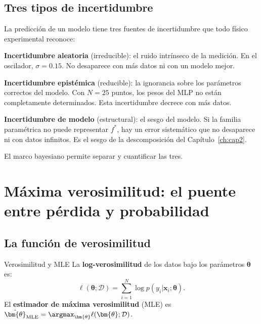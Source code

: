 \subsection{Tres tipos de incertidumbre}
\label{subsec:tres_incertidumbres}

La predicción de un modelo tiene tres fuentes de incertidumbre que todo
físico experimental reconoce:

\textbf{Incertidumbre aleatoria} (irreducible): el ruido intrínseco de
la medición. En el oscilador, $\sigma = 0.15$. No desaparece con más
datos ni con un modelo mejor.

\textbf{Incertidumbre epistémica} (reducible): la ignorancia sobre los
parámetros correctos del modelo. Con $N = 25$ puntos, los pesos del MLP
no están completamente determinados. Esta incertidumbre decrece con más
datos.

\textbf{Incertidumbre de modelo} (estructural): el sesgo del modelo.
Si la familia paramétrica no puede representar $f^*$, hay un error
sistemático que no desaparece ni con datos infinitos. Es el sesgo de la
descomposición del Capítulo~\ref{ch:cap2}.

El marco bayesiano permite separar y cuantificar las tres.

\section{Máxima verosimilitud: el puente entre pérdida y probabilidad}
\label{sec:mle}


\subsection{La función de verosimilitud}
\label{subsec:verosimilitud}

\begin{definicion}{Verosimilitud y MLE}
\label{def:verosimilitud}
La \textbf{log-verosimilitud} de los datos bajo los parámetros
$\bm{\theta}$ es:
\begin{equation}
  \ell(\bm{\theta};\mathcal{D})
  = \sum_{i=1}^N \log p(y_i|\bm{x}_i;\bm{\theta}).
  \label{eq:loglik}
\end{equation}
El \textbf{estimador de máxima verosimilitud} (MLE) es
$\hat{\bm{\theta}}_{\text{MLE}} = \argmax_{\bm{\theta}}
\ell(\bm{\theta};\mathcal{D})$.
\end{definicion}

